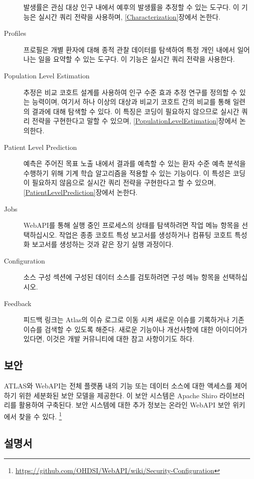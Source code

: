 \documentclass[11pt]{book}
\let\rmarkdownfootnote\footnote%
\def\footnote{\protect\rmarkdownfootnote}
\theoremstyle{definition}
\theoremstyle{definition}
\theoremstyle{definition}
\theoremstyle{remark}
\begin{document}
\begin{description}
발생률은 관심 대상 인구 내에서 예후의 발생률을 추정할 수 있는 도구다. 이
기능은 실시간 쿼리 전략을 사용하며, \ref{Characterization}장에서 논한다.
\item[Profiles \index{ATLAS!profiles}]
프로필은 개별 환자에 대해 종적 관찰 데이터를 탐색하여 특정 개인 내에서
일어나는 일을 요약할 수 있는 도구다. 이 기능은 실시간 쿼리 전략을
사용한다.
\item[Population Level Estimation
\index{ATLAS!population level estimation}]
추정은 비교 코호트 설계를 사용하여 인구 수준 효과 추정 연구를 정의할 수
있는 능력이며, 여기서 하나 이상의 대상과 비교기 코호트 간의 비교를 통해
일련의 결과에 대해 탐색할 수 있다. 이 특징은 코딩이 필요하지 않으므로
실시간 쿼리 전략을 구현한다고 말할 수 있으며,
\ref{PopulationLevelEstimation}장에서 논의한다.
\item[Patient Level Prediction \index{ATLAS!patient level prediction}]
예측은 주어진 목표 노출 내에서 결과를 예측할 수 있는 환자 수준 예측
분석을 수행하기 위해 기계 학습 알고리즘을 적용할 수 있는 기능이다. 이
특성은 코딩이 필요하지 않음으로 실시간 쿼리 전략을 구현한다고 할 수
있으며, \ref{PatientLevelPrediction}장에서 논한다.
\item[Jobs \index{ATLAS!jobs}]
WebAPI를 통해 실행 중인 프로세스의 상태를 탐색하려면 작업 메뉴 항목을
선택하십시오. 작업은 종종 코호트 특성 보고서를 생성하거나 컴퓨팅 코호트
특성화 보고서를 생성하는 것과 같은 장기 실행 과정이다.
\item[Configuration \index{ATLAS!configuration}]
소스 구성 섹션에 구성된 데이터 소스를 검토하려면 구성 메뉴 항목을
선택하십시오.
\item[Feedback \index{ATLAS!feedback}]
피드백 링크는 Atlas의 이슈 로그로 이동 시켜 새로운 이슈를 기록하거나
기존 이슈를 검색할 수 있도록 해준다. 새로운 기능이나 개선사항에 대한
아이디어가 있다면, 이것은 개발 커뮤니티에 대한 참고 사항이기도 하다.
\end{description}

\subsection{보안}

ATLAS와 WebAPI는 전체 플랫폼 내의 기능 또는 데이터 소스에 대한 액세스를
제어하기 위한 세분화된 보안 모델을 제공한다. 이 보안 시스템은 Apache
Shiro 라이브러리를 활용하여 구축된다. 보안 시스템에 대한 추가 정보는
온라인 WebAPI 보안 위키에서 찾을 수 있다. \footnote{\url{https://github.com/OHDSI/WebAPI/wiki/Security-Configuration}}

\subsection{설명서}
\end{document}
